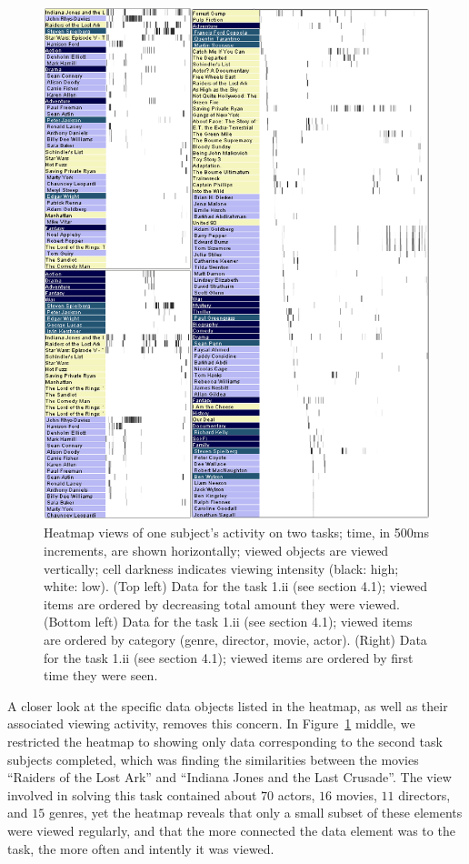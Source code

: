 \begin{figure}[!hbtp]
  \centering
  \includegraphics[width=0.75\linewidth]{images/heatmaps.eps}
  \caption{Heatmap views of one subject's activity on two tasks; time, in 500ms increments, are shown horizontally; viewed objects are viewed vertically; cell darkness indicates viewing intensity (black: high; white: low). (Top left) Data for the task 1.ii (see section 4.1); viewed items are ordered by decreasing total amount they were viewed. (Bottom left) Data for the task 1.ii (see section 4.1); viewed items are ordered by category (genre, director, movie, actor). (Right) Data for the task 1.ii (see section 4.1); viewed items are ordered by first time they were seen. 
}
	\label{fig:heatmap}
\end{figure}


A closer look at the specific data objects listed in the heatmap, as well as their associated viewing activity, removes this concern. In Figure~\ref{fig:heatmap} middle, we restricted the heatmap to showing only data corresponding to the second task subjects completed, which was finding the similarities between the movies ``Raiders of the Lost Ark'' and ``Indiana Jones and the Last Crusade''. The view involved in solving this task contained about $70$ actors, $16$ movies, $11$ directors, and $15$ genres, yet the heatmap reveals that only a small subset of these elements were viewed regularly, and that the more connected the data element was to the task, the more often and intently it was viewed.

